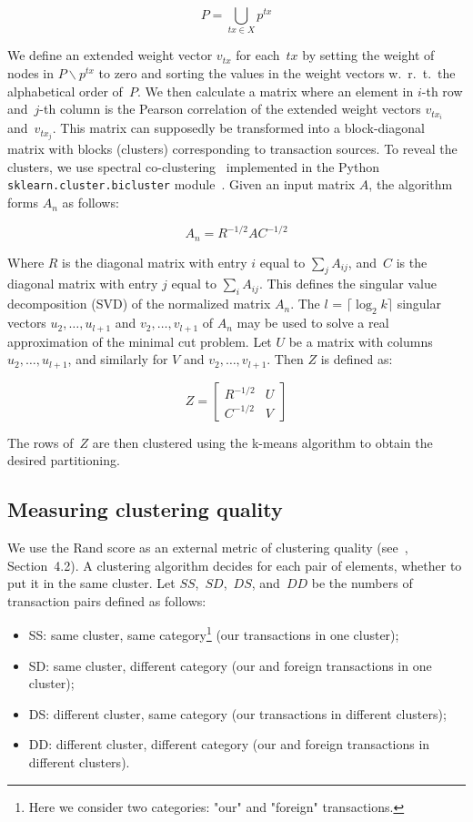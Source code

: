 \[
P = \bigcup\limits_{tx \in X} p^{tx}
\]

We define an extended weight vector $v_{tx}$ for each~$tx$ by setting the weight of nodes in $P \backslash p^{tx}$ to zero and sorting the values in the weight vectors w.~r.~t.~the alphabetical order of~$P$.
We then calculate a matrix where an element in $i$-th row and~$j$-th column is the Pearson correlation of the extended weight vectors $v_{tx_i}$ and~$v_{tx_j}$.
This matrix can supposedly be transformed into a block-diagonal matrix with blocks (clusters) corresponding to transaction sources.
To reveal the clusters, we use spectral co-clustering~\cite{Dhillon2001} implemented in the Python \texttt{sklearn.cluster.bicluster} module~\cite{scikit-learn, scikitlearn2018}.
Given an input matrix $A$, the algorithm forms $A_n$ as follows:

\[
A_n = R^{-1/2}AC^{-1/2}
\]

Where $R$ is the diagonal matrix with entry $i$ equal to $\sum_{j} A_{ij}$, and~$C$ is the diagonal matrix with entry $j$ equal to $\sum_{i} A_{ij}$.
This defines the singular value decomposition (SVD) of the normalized matrix $A_n$.
The $l$ = $\lceil \log_2 k \rceil$ singular vectors $u_2,\dots,u_{l+1}$ and $v_2,\dots,v_{l+1}$ of $A_n$ may be used to solve a real approximation of the minimal cut problem.
Let $U$ be a matrix with columns $u_2,\dots,u_{l+1}$, and similarly for $V$ and $v_2,\dots,v_{l+1}$.
Then $Z$ is defined as:

\[
Z = 
\begin{bmatrix}
R^{-1/2} & U \\
C^{-1/2} & V
\end{bmatrix}
\]

The rows of~$Z$ are then clustered using the k-means algorithm to obtain the desired partitioning.


\subsection{Measuring clustering quality}

We use the Rand score as an external metric of clustering quality (see~\cite{Amigo2009}, Section~4.2).
A clustering algorithm decides for each pair of elements, whether to put it in the same cluster.
Let $SS$,~$SD$,~$DS$, and~$DD$ be the numbers of transaction pairs defined as follows:
\begin{itemize}
	\item SS: same cluster, same category\footnote{Here we consider two categories: "our" and "foreign" transactions.} (our transactions in one cluster);
	\item SD: same cluster, different category (our and foreign transactions in one cluster);
	\item DS: different cluster, same category (our transactions in different clusters);
	\item DD: different cluster, different category (our and foreign transactions in different clusters).
\end{itemize}

